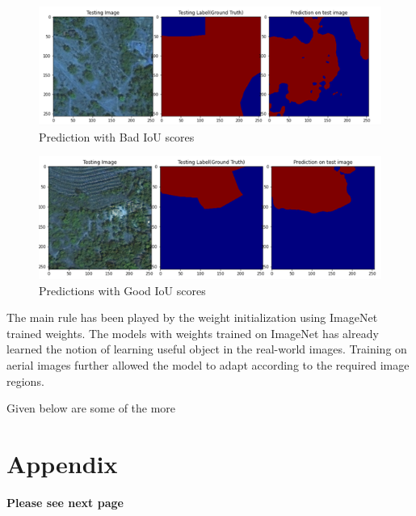 \documentclass[rnd]{mas_proposal}
\begin{document}
\begin{figure}[htp] 
        \centering
        \includegraphics[width=1.2\textwidth]{images/fig12.png}
        \caption{ Prediction with Bad IoU scores}%
        \label{fig: Prediction with Bad IoU scores}%
\end{figure}

\begin{figure}[htp] 
        \centering
        \includegraphics[width=1.2\textwidth]{images/fig13.png}
        \caption{ Predictions with Good  IoU scores}%
        \label{fig: Predictions with Good  IoU scores}%
\end{figure}



The main rule has been played by the weight initialization using ImageNet trained weights. The models with weights trained on ImageNet has already learned the 
notion of learning useful object in the real-world images. Training on aerial images further allowed the model to adapt according to the required image regions. 

Given below are some of the more 

\newpage
 

\newpage
\section{Appendix}


\textbf{Please see next page}



 
\end{document}
